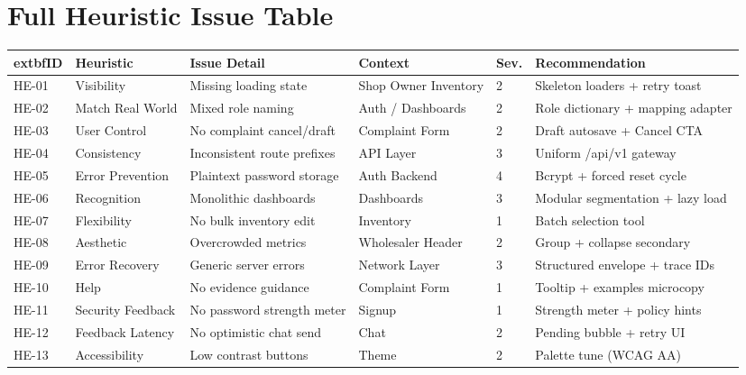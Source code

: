 \documentclass[11pt,a4paper]{article}
\begin{document}
\section{Full Heuristic Issue Table}\label{app:he-full}
\begin{longtable}{|p{1.1cm}|p{2.3cm}|p{3.6cm}|p{2.3cm}|p{0.9cm}|p{4.1cm}|}
	\hline
		extbf{ID} & \textbf{Heuristic} & \textbf{Issue Detail} & \textbf{Context} & \textbf{Sev.} & \textbf{Recommendation} \\
	\hline
	HE-01 & Visibility & Missing loading state & Shop Owner Inventory & 2 & Skeleton loaders + retry toast \\
	\hline
	HE-02 & Match Real World & Mixed role naming & Auth / Dashboards & 2 & Role dictionary + mapping adapter \\
	\hline
	HE-03 & User Control & No complaint cancel/draft & Complaint Form & 2 & Draft autosave + Cancel CTA \\
	\hline
	HE-04 & Consistency & Inconsistent route prefixes & API Layer & 3 & Uniform /api/v1 gateway \\
	\hline
	HE-05 & Error Prevention & Plaintext password storage & Auth Backend & 4 & Bcrypt + forced reset cycle \\
	\hline
	HE-06 & Recognition & Monolithic dashboards & Dashboards & 3 & Modular segmentation + lazy load \\
	\hline
	HE-07 & Flexibility & No bulk inventory edit & Inventory & 1 & Batch selection tool \\
	\hline
	HE-08 & Aesthetic & Overcrowded metrics & Wholesaler Header & 2 & Group + collapse secondary \\
	\hline
	HE-09 & Error Recovery & Generic server errors & Network Layer & 3 & Structured envelope + trace IDs \\
	\hline
	HE-10 & Help & No evidence guidance & Complaint Form & 1 & Tooltip + examples microcopy \\
	\hline
	HE-11 & Security Feedback & No password strength meter & Signup & 1 & Strength meter + policy hints \\
	\hline
	HE-12 & Feedback Latency & No optimistic chat send & Chat & 2 & Pending bubble + retry UI \\
	\hline
	HE-13 & Accessibility & Low contrast buttons & Theme & 2 & Palette tune (WCAG AA) \\
	\hline
\end{longtable}
\end{document}
